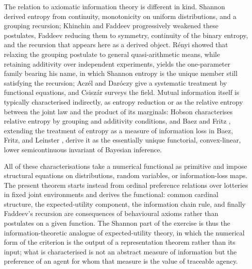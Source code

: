 \documentclass[11pt,a4paper]{article}
\theoremstyle{definition}
\newcommand{\1}{\mathbf 1}
\begin{document}
The relation to axiomatic information theory is different in kind.  Shannon \cite{Shannon1948} derived entropy from
continuity, monotonicity on uniform distributions, and a grouping recursion; Khinchin \cite{Khinchin1957} and Faddeev
\cite{Faddeev1956} progressively weakened these postulates, Faddeev reducing them to symmetry, continuity of the
binary entropy, and the recursion that appears here as a derived object.  R\'enyi \cite{Renyi1961} showed that
relaxing the grouping postulate to general quasi-arithmetic means, while retaining additivity over independent
experiments, yields the one-parameter family bearing his name, in which Shannon entropy is the unique member still
satisfying the recursion; Acz\'el and Dar\'oczy \cite{AczelDaroczy1975} give a systematic treatment by functional
equations, and Csisz\'ar \cite{Csiszar2008} surveys the field.  Mutual information itself is typically characterised
indirectly, as entropy reduction or as the relative entropy between the joint law and the product of its marginals:
Hobson \cite{Hobson1969} characterises relative entropy by grouping and additivity conditions, and Baez and Fritz
\cite{BaezFritz2014}, extending the treatment of entropy as a measure of information loss in Baez, Fritz, and Leinster
\cite{BaezFritzLeinster2011}, derive it as the essentially unique functorial, convex-linear, lower semicontinuous
invariant of Bayesian inference.

All of these characterisations take a numerical functional as primitive and impose structural equations on
distributions, random variables, or information-loss maps.  The present theorem starts instead from ordinal preference
relations over lotteries in fixed joint environments and derives the functional: common cardinal structure, the
expected-utility component, the information chain rule, and finally Faddeev's recursion are consequences of
behavioural axioms rather than postulates on a given function.  The Shannon part of the exercise is thus the
information-theoretic analogue of expected-utility theory, in which the numerical form of the criterion is the output
of a representation theorem rather than its input; what is characterised is not an abstract measure of information
but the preference of an agent for whom that measure is the value of traceable agency.
\end{document}
